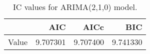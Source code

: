 \begin{table}[ht]
\centering
\begin{tabular}{rrrr}
  \hline
 & AIC & AICc & BIC \\ 
  \hline
Value & 9.707301 & 9.707400 & 9.741330 \\ 
   \hline
\end{tabular}
\caption{IC values for ARIMA(2,1,0) model.}
\end{table}